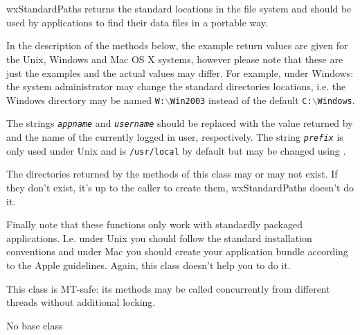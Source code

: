
\section{}\label{wxstandardpaths}

wxStandardPaths returns the standard locations in the file system and should be
used by applications to find their data files in a portable way.

In the description of the methods below, the example return values are given
for the Unix, Windows and Mac OS X systems, however please note that these are
just the examples and the actual values may differ. For example, under Windows:
the system administrator may change the standard directories locations, i.e.
the Windows directory may be named \texttt{W:$\backslash$Win2003} instead of
the default \texttt{C:$\backslash$Windows}.

The strings \texttt{\textit{appname}} and \texttt{\textit{username}} should be
replaced with the value returned by  
and the name of the currently logged in user, respectively. The string 
\texttt{\textit{prefix}} is only used under Unix and is \texttt{/usr/local} by
default but may be changed using .

The directories returned by the methods of this class may or may not exist. If
they don't exist, it's up to the caller to create them, wxStandardPaths doesn't
do it.

Finally note that these functions only work with standardly packaged
applications. I.e. under Unix you should follow the standard installation
conventions and under Mac you should create your application bundle according
to the Apple guidelines. Again, this class doesn't help you to do it.

This class is MT-safe: its methods may be called concurrently from different
threads without additional locking.


No base class

